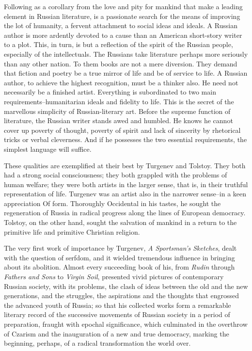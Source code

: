 Following as a corollary from the love and pity for mankind that make
a leading element in Russian literature, is a passionate search for
the means of improving the lot of humanity, a fervent attachment to
social ideas and ideals. A Russian author is more ardently devoted to
a cause than an American short-story writer to a plot. This, in turn,
is but a reflection of the spirit of the Russian people, especially of
the intellectuals. The Russians take literature perhaps more seriously
than any other nation. To them books are not a mere diversion. They
demand that fiction and poetry be a true mirror of life and be of
service to life. A Russian author, to achieve the highest recognition,
must be a thinker also. He need not necessarily be a finished artist.
Everything is subordinated to two main requirements--humanitarian
ideals and fidelity to life. This is the secret of the marvellous
simplicity of Russian-literary art. Before the supreme function of
literature, the Russian writer stands awed and humbled. He knows he
cannot cover up poverty of thought, poverty of spirit and lack of
sincerity by rhetorical tricks or verbal cleverness. And if he
possesses the two essential requirements, the simplest language will
suffice.

These qualities are exemplified at their best by Turgenev and Tolstoy.
They both had a strong social consciousness; they both grappled with
the problems of human welfare; they were both artists in the larger
sense, that is, in their truthful representation of life. Turgenev was
an artist also in the narrower sense--in a keen appreciation Of form.
Thoroughly Occidental in his tastes, he sought the regeneration of
Russia in radical progress along the lines of European democracy.
Tolstoy, on the other hand, sought the salvation of mankind in a
return to the primitive life and primitive Christian religion.

The very first work of importance by Turgenev, \emph{A Sportsman's
Sketches}, dealt with the question of serfdom, and it wielded
tremendous influence in bringing about its abolition. Almost every
succeeding book of his, from \emph{Rudin} through \emph{Fathers and Sons} to
\emph{Virgin Soil}, presented vivid pictures of contemporary Russian
society, with its problems, the clash of ideas between the old and the
new generations, and the struggles, the aspirations and the thoughts
that engrossed the advanced youth of Russia; so that his collected
works form a remarkable literary record of the successive movements of
Russian society in a period of preparation, fraught with epochal
significance, which culminated in the overthrow of Czarism and the
inauguration of a new and true democracy, marking the beginning,
perhaps, of a radical transformation the world over.

